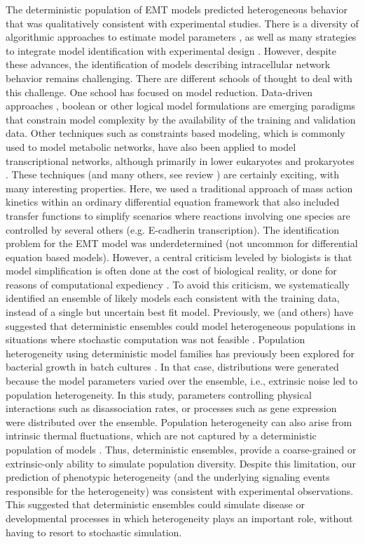 \documentclass[11pt,letterpaper]{article}
\begin{document}
The deterministic population of EMT models predicted heterogeneous behavior that was qualitatively consistent with experimental studies.
There is a diversity of algorithmic approaches to estimate model parameters \cite{Moles:2003aa}, as well as many strategies to integrate model identification with experimental design \cite{Rodriguez-Fernandez:2013aa,Villaverde:2014aa}.
However, despite these advances, the identification of models describing intracellular network behavior remains challenging.
There are different schools of thought to deal with this challenge.
One school has focused on model reduction.
Data-driven approaches \cite{Cirit:2012kx}, boolean \cite{Choi:2012bs} or other logical model formulations \cite{Morris:2011ys,Terfve:2012kq}
are emerging paradigms that constrain model complexity by the availability of the training and validation data.
Other techniques such as constraints based modeling, which is commonly used to model metabolic networks, have also been applied to model transcriptional networks, although primarily in lower eukaryotes and prokaryotes \cite{Hyduke:2010rt}. These techniques (and many others, see review \cite{Wayman2013}) are certainly exciting, with many interesting properties.
Here, we used a traditional approach of mass action kinetics within an ordinary differential equation framework that also included transfer functions to simplify scenarios where reactions involving one species are controlled by several others (e.g. E-cadherin transcription).
The identification problem for the EMT model was underdetermined (not uncommon for differential equation based models).
However, a central criticism leveled by biologists is that model simplification is often done at the cost of biological reality, or done for reasons of computational expediency \cite{Sainani2012}.
To avoid this criticism, we systematically identified an ensemble of likely models each consistent with the training data, instead of a single but uncertain best fit model.
Previously, we (and others) have suggested that deterministic ensembles could model heterogeneous populations in situations where stochastic computation was not feasible \cite{Lequieu:2011fj}.
Population heterogeneity using deterministic model families has previously been explored for bacterial growth in batch cultures \cite{Lee:2009fk}.
In that case, distributions were generated because the model parameters varied over the ensemble, i.e., extrinsic noise led to population heterogeneity.
In this study, parameters controlling physical interactions such as disassociation rates, or processes such as gene expression were distributed over the ensemble.
Population heterogeneity can also arise from intrinsic thermal fluctuations, which are not captured by a deterministic population of models \cite{Swain:2002ve}.
Thus, deterministic ensembles, provide a coarse-grained or extrinsic-only ability to simulate population diversity. Despite this limitation, our prediction of phenotypic heterogeneity
(and the underlying signaling events responsible for the heterogeneity) was consistent with experimental observations. This suggested that deterministic ensembles could simulate
disease or developmental processes in which heterogeneity plays an important role, without having to resort to stochastic simulation.
\end{document}
